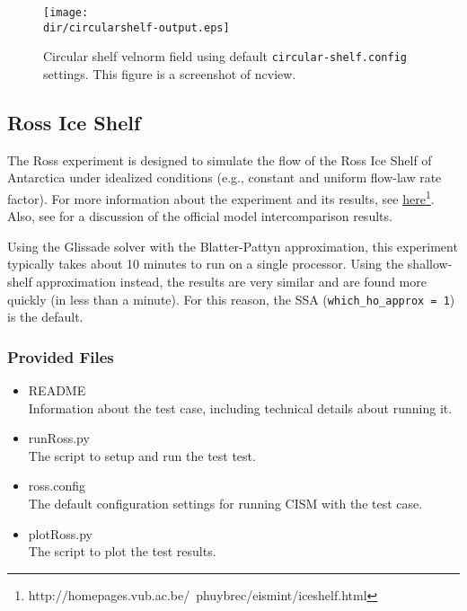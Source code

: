 \begin{figure}[H!]
	\centering
	\texttt{[image: \\dir/circularshelf-output.eps]}
	\caption{Circular shelf velnorm field using default \texttt{circular-shelf.config} settings. This figure is a screenshot of ncview.}
	\label{fig:circularshelf-results}
\end{figure}
\FloatBarrier

\subsection{Ross Ice Shelf}
The Ross experiment is designed to simulate the flow of the Ross Ice Shelf of Antarctica under idealized conditions (e.g., constant and uniform
flow-law rate factor). For more information about the experiment and its results, see 
\href{http://homepages.vub.ac.be/~phuybrec/eismint/iceshelf.html}{here}\footnote{http://homepages.vub.ac.be/~phuybrec/eismint/iceshelf.html}. 
Also, see \citet{MacAyeal:1996vn} for a discussion of the official model intercomparison results.

Using the Glissade solver with the Blatter-Pattyn approximation, this experiment typically 
takes about 10 minutes to run on a single processor.  Using the shallow-shelf approximation instead,
the results are very similar and are found more quickly (in less than a minute).
For this reason, the SSA (\texttt{which\_ho\_approx = 1}) is the default.

\subsubsection{Provided Files}

\begin{itemize}
	\item README \\
		Information about the test case, including technical details about running it.
	\item runRoss.py \\
		The script to setup and run the test test.
	\item ross.config \\
  The default configuration settings for running CISM with the test case.
	\item plotRoss.py \\
		The script to plot the test results.
\end{itemize}

